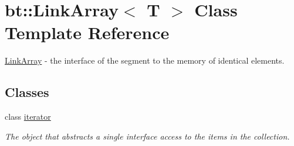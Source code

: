 \hypertarget{classbt_1_1_link_array}{\section{bt\-:\-:Link\-Array$<$ T $>$ Class Template Reference}
\label{classbt_1_1_link_array}
}


\hyperlink{classbt_1_1_link_array}{Link\-Array} -\/ the interface of the segment to the memory of identical elements.  


\subsection*{Classes}
\begin{DoxyCompactItemize}
\item 
class \hyperlink{classbt_1_1_link_array_1_1iterator}{iterator}
\begin{DoxyCompactList}\small\item\em The object that abstracts a single interface access to the items in the collection. \end{DoxyCompactList}\end{DoxyCompactItemize}

